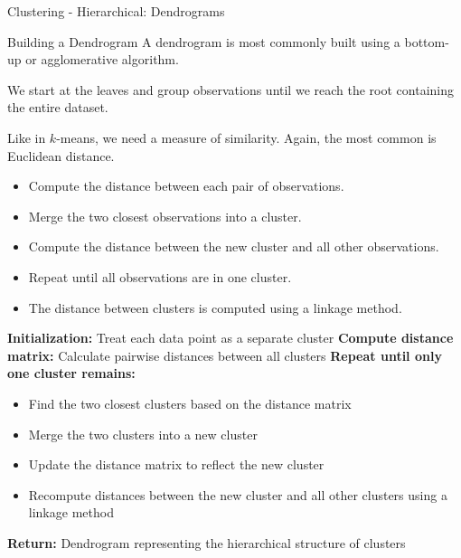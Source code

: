 \begin{frame}[allowframebreaks]{Clustering - Hierarchical: Dendrograms}
\framebreak

\begin{block}{Building a Dendrogram}
    A dendrogram is most commonly built using a bottom-up or agglomerative algorithm.

    \vspace{0.8em}

    We start at the leaves and group observations until we reach the root  containing the entire dataset.
    
    \vspace{0.8em}

    Like in $k$-means, we need a measure of similarity. Again, the most  common is Euclidean distance.

    \vspace{0.8em}

    \begin{itemize}
        \setlength{\itemsep}{0.5em}
        \item Compute the distance between each pair of observations.
        \item Merge the two closest observations into a cluster.
        \item Compute the distance between the new cluster and all other observations.
        \item Repeat until all observations are in one cluster.
        \item The distance between clusters is computed using a linkage method.
    \end{itemize}
\end{block}

\framebreak

\begin{algorithm}[H]
\caption{Hierarchical Clustering Algorithm}
\textbf{Initialization:} Treat each data point as a separate cluster\;
\textbf{Compute distance matrix:} Calculate pairwise distances between all clusters\;
\textbf{Repeat until only one cluster remains:}
\begin{itemize}
    \item Find the two closest clusters based on the distance matrix\;
    \item Merge the two clusters into a new cluster\;
    \item Update the distance matrix to reflect the new cluster\;
    \item Recompute distances between the new cluster and all other clusters using a linkage method\;
\end{itemize}
\textbf{Return:} Dendrogram representing the hierarchical structure of clusters\;
\end{algorithm}


\end{frame}
